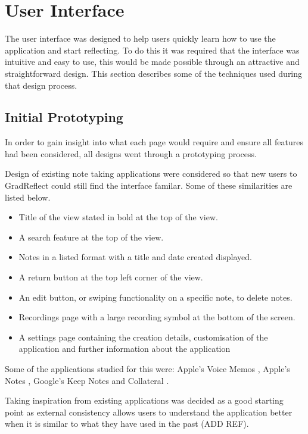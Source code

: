 \documentclass{l4proj}
\begin{document}
\section{User Interface}

The user interface was designed to help users quickly learn how to use the application and start reflecting. To do this it was required that the 
interface was intuitive and easy to use, this would be made possible through an attractive and straightforward design. This section describes
some of the techniques used during that design process.

\subsection{Initial Prototyping}

In order to gain insight into what each page would require and ensure all features had been considered, all designs went through a prototyping process. 

Design of existing note taking applications were considered so that new users to GradReflect could still find the interface familar. Some of these similarities
are listed below.

\begin{itemize}
    \item Title of the view stated in bold at the top of the view.
    \item A search feature at the top of the view.
    \item Notes in a listed format with a title and date created displayed.
    \item A return button at the top left corner of the view.
    \item An edit button, or swiping functionality on a specific note, to delete notes.
    \item Recordings page with a large recording symbol at the bottom of the screen.
    \item A settings page containing the creation details, customisation of the application and further information about the application
\end{itemize}

Some of the applications studied for this were: Apple's Voice Memos \citep{apple_inc_voice_2021}, Apple's Notes \citep{apple_inc_notes_2021}, Google's 
Keep Notes \citep{google_llc_google_2021} and Collateral \citep{vargas_collateral_2021}.

Taking inspiration from existing applications was decided as a good starting point as external consistency allows users to understand the application better
when it is similar to what they have used in the past (ADD REF). 
\end{document}
